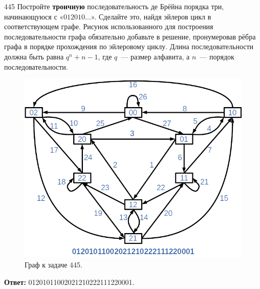 \begin{task}{445}
Постройте \textbf{троичную} последовательность де Брёйна порядка три, начинающуюся с «\(012010\ldots\)». Сделайте это, найдя эйлеров цикл в соответствующем графе. Рисунок использованного для построения последовательности графа обязательно добавьте в решение, пронумеровав рёбра графа в порядке прохождения по эйлеровому циклу. Длина последовательности должна быть равна \(q^n+n-1\), где \(q\)~--- размер алфавита, а \(n\)~--- порядок последовательности.
\end{task}

\begin{figure}[H]
    \centering
    \includegraphics[scale=0.6]{Fall/img/solution-445_answer.png}
    \caption{Граф к задаче 445.} \label{graph 381}
\end{figure}

\textbf{Ответ:} 01201011002021210222111220001.
